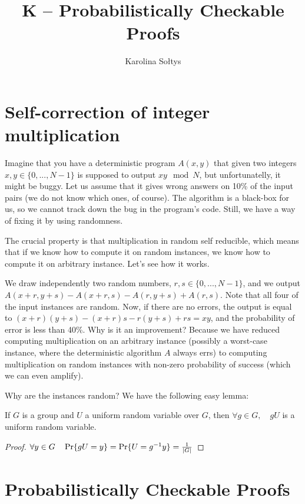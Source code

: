 \documentclass{llncs}
\title{K -- Probabilistically Checkable Proofs}
\author{Karolina Sołtys \\
\email{ksoltys@students.mimuw.edu.pl}}
\institute{}
\begin{document}
\maketitle
\pagestyle{plain}


\section{Self-correction of integer multiplication}

Imagine that you have a deterministic program $A(x,y)$ that given two integers $x, y \in \{0,...,N-1\}$ is supposed to output $xy \mod N$, but unfortunatelly, it might be buggy. Let us assume that it gives wrong answers on 10\% of the input pairs (we do not know which ones, of course). The algorithm is a black-box for us, so we cannot track down the bug in the program's code. Still, we have a way of fixing it by using randomness.

The crucial property is that multiplication in random self reducible, which means that if we know how to compute it on random instances, we know how to compute it on arbitrary instance. Let's see how it works.

We draw independently two random numbers, $r, s \in \{0,...,N-1\}$, and we output $A(x+r, y+s) - A(x+r, s) - A(r, y+s) + A(r,s)$. Note that all four of the input instances are random. Now, if there are no errors, the output is equal to $(x+r)(y+s) - (x+r)s - r(y+s) + rs = xy$, and the probability of error is less than 40\%. 
Why is it an improvement? Because we have reduced computing multiplication on an arbitrary instance (possibly a worst-case instance, where the deterministic algorithm $A$ always errs) to computing multiplication on random instances with non-zero probability of success (which we can even amplify).

Why are the instances random? We have the following easy lemma:

\begin{lemma} If $G$ is a group and $U$ a uniform random variable over $G$, then $\forall g \in G, \quad gU$ is a uniform random variable.\end{lemma}
\begin{proof} $\forall y \in G \quad \Pr\{gU = y\} = \Pr\{U=g^{-1}y\} = {1 \over |G|}$ \end{proof}

\section{Probabilistically Checkable Proofs}
\end{document}
